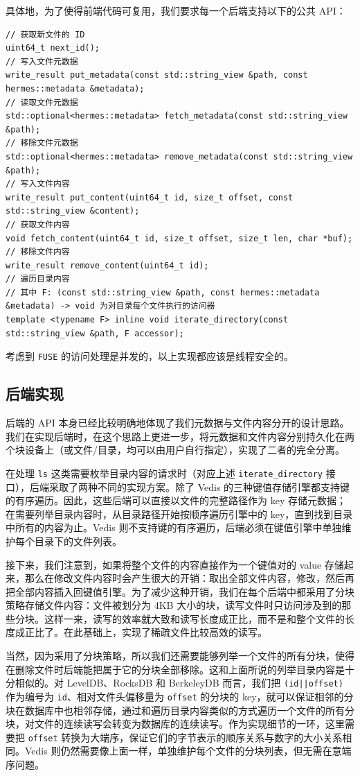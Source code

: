 \documentclass{ctexart}
\begin{document}
具体地，为了使得前端代码可复用，我们要求每一个后端支持以下的公共 API：

\begin{verbatim}
// 获取新文件的 ID
uint64_t next_id();
// 写入文件元数据
write_result put_metadata(const std::string_view &path, const hermes::metadata &metadata);
// 读取文件元数据
std::optional<hermes::metadata> fetch_metadata(const std::string_view &path);
// 移除文件元数据
std::optional<hermes::metadata> remove_metadata(const std::string_view &path);
// 写入文件内容
write_result put_content(uint64_t id, size_t offset, const std::string_view &content);
// 获取文件内容
void fetch_content(uint64_t id, size_t offset, size_t len, char *buf);
// 移除文件内容
write_result remove_content(uint64_t id);
// 遍历目录内容
// 其中 F: (const std::string_view &path, const hermes::metadata &metadata) -> void 为对目录每个文件执行的访问器
template <typename F> inline void iterate_directory(const std::string_view &path, F accessor);
\end{verbatim}

考虑到 \texttt{FUSE} 的访问处理是并发的，以上实现都应该是线程安全的。

\subsection{后端实现}

后端的 API 本身已经比较明确地体现了我们元数据与文件内容分开的设计思路。我们在实现后端时，在这个思路上更进一步，将元数据和文件内容分别持久化在两个块设备上（或文件/目录，均可以由用户自行指定），实现了二者的完全分离。

在处理 \texttt{ls} 这类需要枚举目录内容的请求时（对应上述 \texttt{iterate\_directory} 接口），后端采取了两种不同的实现方案。除了 Vedis 的三种键值存储引擎都支持键的有序遍历。因此，这些后端可以直接以文件的完整路径作为 key 存储元数据；在需要列举目录内容时，从目录路径开始按顺序遍历引擎中的 key，直到找到目录中所有的内容为止。Vedis 则不支持键的有序遍历，后端必须在键值引擎中单独维护每个目录下的文件列表。

接下来，我们注意到，如果将整个文件的内容直接作为一个键值对的 value 存储起来，那么在修改文件内容时会产生很大的开销：取出全部文件内容，修改，然后再把全部内容插入回键值引擎。为了减少这种开销，我们在每个后端中都采用了分块策略存储文件内容：文件被划分为 4KB 大小的块，读写文件时只访问涉及到的那些分块。这样一来，读写的效率就大致和读写长度成正比，而不是和整个文件的长度成正比了。在此基础上，实现了稀疏文件比较高效的读写。

当然，因为采用了分块策略，所以我们还需要能够列举一个文件的所有分块，使得在删除文件时后端能把属于它的分块全部移除。这和上面所说的列举目录内容是十分相似的。对 LevelDB、RocksDB 和 BerkeleyDB 而言，我们把 \texttt{(id||offset)} 作为编号为 \texttt{id}、相对文件头偏移量为 \texttt{offset} 的分块的 key，就可以保证相邻的分块在数据库中也相邻存储，通过和遍历目录内容类似的方式遍历一个文件的所有分块，对文件的连续读写会转变为数据库的连续读写。作为实现细节的一环，这里需要把 \texttt{offset} 转换为大端序，保证它们的字节表示的顺序关系与数字的大小关系相同。Vedis 则仍然需要像上面一样，单独维护每个文件的分块列表，但无需在意端序问题。
\end{document}
